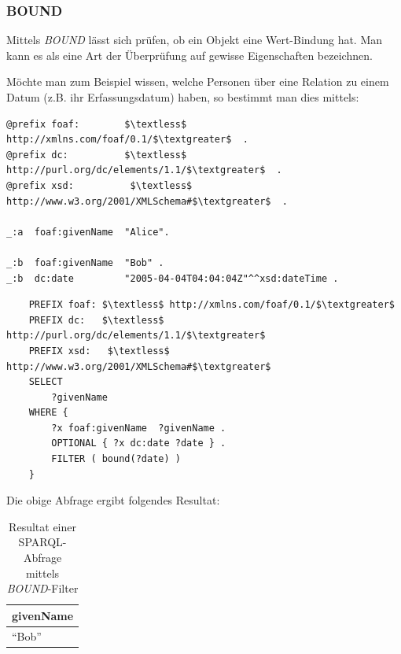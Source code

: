 \subsubsection{BOUND}
\label{subsec:sparql_ausdruecke_funktionen_bound}
Mittels \textit{BOUND} lässt sich prüfen, ob ein Objekt eine Wert-Bindung hat. Man kann es als eine Art der Überprüfung auf gewisse Eigenschaften bezeichnen.

Möchte man zum Beispiel wissen, welche Personen über eine Relation zu einem Datum (z.B. ihr Erfassungsdatum) haben, so bestimmt man dies mittels:
\begin{lstlisting}
@prefix foaf:        $\textless$ http://xmlns.com/foaf/0.1/$\textgreater$  .
@prefix dc:          $\textless$ http://purl.org/dc/elements/1.1/$\textgreater$  .
@prefix xsd:          $\textless$ http://www.w3.org/2001/XMLSchema#$\textgreater$  .

_:a  foaf:givenName  "Alice".

_:b  foaf:givenName  "Bob" .
_:b  dc:date         "2005-04-04T04:04:04Z"^^xsd:dateTime .
\end{lstlisting}

\begin{lstlisting}
    PREFIX foaf: $\textless$ http://xmlns.com/foaf/0.1/$\textgreater$ 
    PREFIX dc:   $\textless$ http://purl.org/dc/elements/1.1/$\textgreater$ 
    PREFIX xsd:   $\textless$ http://www.w3.org/2001/XMLSchema#$\textgreater$ 
    SELECT
        ?givenName
    WHERE {
        ?x foaf:givenName  ?givenName .
        OPTIONAL { ?x dc:date ?date } .
        FILTER ( bound(?date) )
    }
\end{lstlisting}

Die obige Abfrage ergibt folgendes Resultat:
\noindent\hspace*{15mm}
\begin{table}[h]
    \centering
    \begin{tabular}{|l|}
        \hline
        \multicolumn{1}{|c|}{\textbf{givenName}} \\ \hline
        ``Bob''                    \\ \hline
    \end{tabular}
    \caption{Resultat einer SPARQL-Abfrage mittels \textit{BOUND}-Filter\protect\footnotemark}
\end{table}

